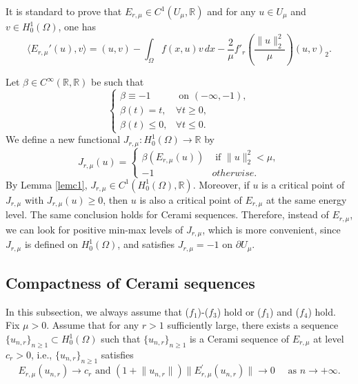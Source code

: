 \documentclass[11pt]{amsart}
\newcommand{\norm}[1]{\lVert#1\rVert}
\newcommand{\R}{\mathbb{R}}
\numberwithin{equation}{section}
\begin{document}
It is standard to prove that $E_{r, \mu} \in C^1(U_{\mu},\R)$ and for any $u \in U_{\mu}$ and $v \in H_0^1(\Omega)$, one has
$$
\langle E_{r, \mu}'(u),v\rangle = (u,v)-\int_\Omega f(x,u)v \,dx-\frac{2}{\mu}f'_r\left(\frac{\norm{u}_2^2}{\mu}\right)(u,v)_2.
$$

Let $\beta \in C^\infty(\mathbb{R},\mathbb{R})$ be such that
$$
\begin{cases}
    \beta \equiv -1 &\text{ on } (-\infty,-1),\\
    \beta (t)=t, &\forall t\geq 0,\\
    \beta (t)\leq 0,  &\forall t\leq  0.
\end{cases}
$$
We define a new functional $J_{r,\mu}: H^1_0(\Omega) \to \mathbb{R}$ by
\begin{equation} \label{Jrmu}
J_{r,\mu}(u) =
\begin{cases}
    \beta(E_{r,\mu}(u)) &\text{ if } \norm{u}_2^2<\mu,\\
    -1  &otherwise.
\end{cases}
\end{equation}
By Lemma \ref{lemc1}, $J_{r,\mu}\in C^1(H^1_0(\Omega),\R)$. Moreover, if $u$ is a critical point of $J_{r,\mu}$ with $J_{r,\mu}(u) \geq 0$, then $u$ is also a critical point of $E_{r,\mu}$ at the same energy level.  The same conclusion holds for Cerami sequences. Therefore, instead of $E_{r,\mu}$, we can look for positive min-max levels of $J_{r,\mu}$, which is more convenient, since  $J_{r,\mu}$ is defined on $H^1_0(\Omega)$, and satisfies $J_{r,\mu}=-1$ on $\partial U_\mu$.
\subsection{Compactness of Cerami sequences}\label{seccompact}
In this subsection, we always assume that ($f_1$)-($f_3$) hold or ($f_1$) and ($f_4$) hold. Fix $\mu >0$. Assume that for any $r >1$ sufficiently large, there exists a sequence $\{u_{n,r}\}_{n\geq 1}\subset H^1_0(\Omega)$ such that $\{u_{n,r}\}_{n\geq 1}$ is a Cerami sequence of $E_{r,\mu}$ at level $c_r>0$, i.e., $\{u_{n,r}\}_{n\geq 1}$ satisfies
\begin{equation} \label{ceramisequence}
E_{r,\mu}(u_{n,r}) \rightarrow c_r \text{ and } (1+\norm{u_{n,r}})\norm{E_{r, \mu}^{\prime}(u_{n,r})} \rightarrow 0 \quad \text{ as } n \to +\infty.
\end{equation}
\end{document}
